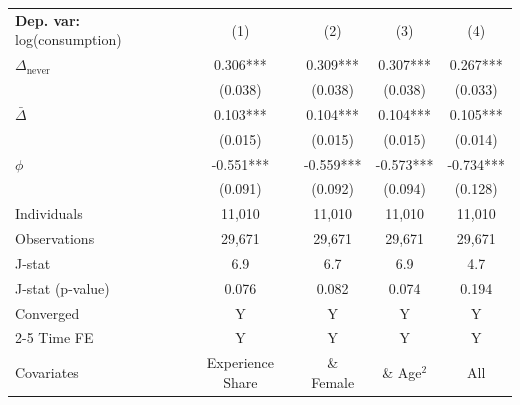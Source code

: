 \begin{tabular}{l cccc} \toprule  \textbf{Dep. var:}  log(consumption) 
                    &\multicolumn{1}{c}{(1)}   &\multicolumn{1}{c}{(2)}   &\multicolumn{1}{c}{(3)}   &\multicolumn{1}{c}{(4)}   \\

\addlinespace
$\Delta_{\text{never}}$&       0.306***&       0.309***&       0.307***&       0.267***\\
                    &     (0.038)   &     (0.038)   &     (0.038)   &     (0.033)   \\

\addlinespace
$\bar{\Delta}$      &       0.103***&       0.104***&       0.104***&       0.105***\\
                    &     (0.015)   &     (0.015)   &     (0.015)   &     (0.014)   \\

\addlinespace
$\phi$              &      -0.551***&      -0.559***&      -0.573***&      -0.734***\\
                    &     (0.091)   &     (0.092)   &     (0.094)   &     (0.128)   \\
\addlinespace
Individuals         &      11,010   &      11,010   &      11,010   &      11,010   \\
Observations        &      29,671   &      29,671   &      29,671   &      29,671   \\
J-stat              &         6.9   &         6.7   &         6.9   &         4.7   \\
J-stat (p-value)    &       0.076   &       0.082   &       0.074   &       0.194   \\
Converged           &           Y   &           Y   &           Y   &           Y   \\
\cmidrule{2-5} Time FE & Y & Y & Y & Y \\ Covariates & Experience Share & \& Female & \& Age$^2$ & All \\ \bottomrule \end{tabular}
